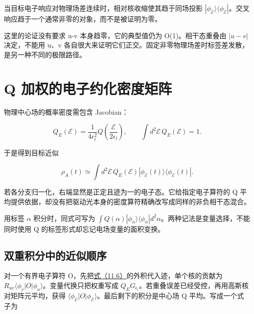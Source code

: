 \documentclass[UTF8,a4paper,zihao=-4,openany,fontset=fandol]{ctexbook}
\begin{document}
当目标电子响应对物理场差连续时，相对核收缩使其趋于同场投影 $|\phi_{\overline{\mathcal E}}\rangle\langle\phi_{\overline{\mathcal E}}|$。交叉响应趋于一个通常非零的对象，而不是被证明为零。



这里的论证没有要求 u-v 本身趋零，它的典型值仍为 O(1)。相干态重叠由 $|u-v|$ 决定，不能用 u、v 各自很大来证明它们正交。固定非零物理场差时标签差发散，是另一种不同的极限路径。



\section{Q 加权的电子约化密度矩阵}\label{sec:12:9}


物理中心场的概率密度需包含 Jacobian：



\begin{equation*}
Q_E(\mathcal E)=\frac1{4\epsilon_l^2}
Q\!\left(\frac{\mathcal E}{2\epsilon_l}\right),
\qquad\int d^2\mathcal E\,Q_E(\mathcal E)=1.
\tag{12.7}\label{eq:12.7}
\end{equation*}


于是得到目标近似



\begin{equation*}
\rho_A(t)\simeq\int d^2\mathcal E\,Q_E(\mathcal E)
|\phi_{\mathcal E}(t)\rangle\langle\phi_{\mathcal E}(t)|.
\tag{12.8}\label{eq:12.8}
\end{equation*}


若各分支归一化，右端显然是正定且迹为一的电子态。它给指定电子算符的 Q 平均提供依据，却没有把驱动光本身的密度算符精确改写成同样的非负相干态混合。



用标签 $\alpha$ 积分时，同式可写为 $\int Q(\alpha)|\phi_\alpha\rangle\langle\phi_\alpha|d^2\alpha$。两种记法是变量选择，不能同时使用 Q 的标签形式却忘记电场变量的面积变换。



\subsection{双重积分中的近似顺序}


对一个有界电子算符 O，先把\hyperref[eq:11.6]{式（11.6）}的外积代入迹，单个核的贡献为 $R_{uv}\langle\phi_v|O|\phi_u\rangle$。变量代换只把权重写成 $Q_EG_{\epsilon_l}$。若重叠误差已经受控，再用高斯核对矩阵元平均，获得 $\langle\phi_{\mathcal E}|O|\phi_{\mathcal E}\rangle$。最后剩下的积分是中心场 Q 平均。写成一个式子为
\end{document}
